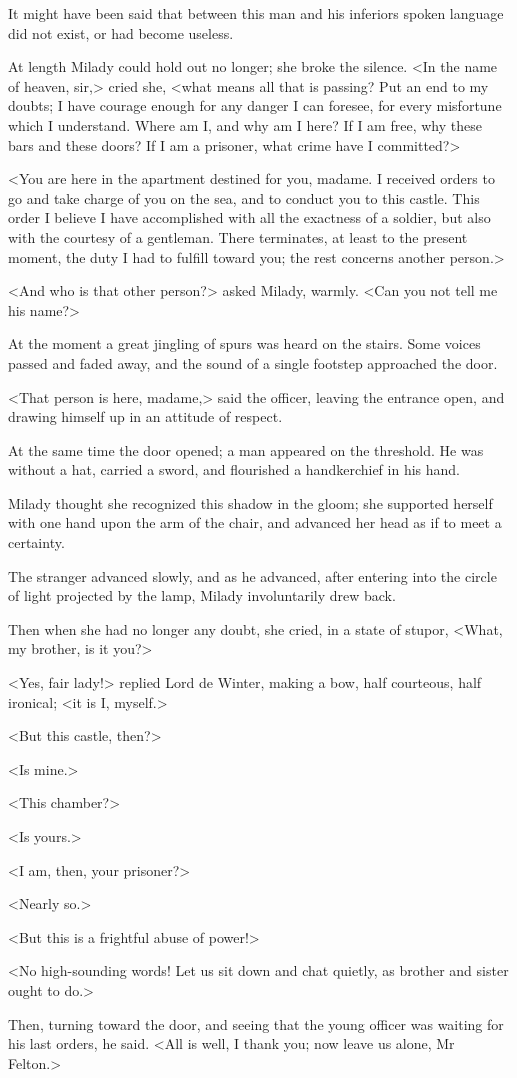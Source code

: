 It might have been said that between this man and his inferiors spoken language did not exist, or had become useless. 

At length Milady could hold out no longer; she broke the silence. <In the name of heaven, sir,> cried she, <what means all that is passing? Put an end to my doubts; I have courage enough for any danger I can foresee, for every misfortune which I understand. Where am I, and why am I here? If I am free, why these bars and these doors? If I am a prisoner, what crime have I committed?> 

<You are here in the apartment destined for you, madame. I received orders to go and take charge of you on the sea, and to conduct you to this castle. This order I believe I have accomplished with all the exactness of a soldier, but also with the courtesy of a gentleman. There terminates, at least to the present moment, the duty I had to fulfill toward you; the rest concerns another person.> 

<And who is that other person?> asked Milady, warmly. <Can you not tell me his name?> 

At the moment a great jingling of spurs was heard on the stairs. Some voices passed and faded away, and the sound of a single footstep approached the door. 

<That person is here, madame,> said the officer, leaving the entrance open, and drawing himself up in an attitude of respect. 

At the same time the door opened; a man appeared on the threshold. He was without a hat, carried a sword, and flourished a handkerchief in his hand. 

Milady thought she recognized this shadow in the gloom; she supported herself with one hand upon the arm of the chair, and advanced her head as if to meet a certainty. 

The stranger advanced slowly, and as he advanced, after entering into the circle of light projected by the lamp, Milady involuntarily drew back. 

Then when she had no longer any doubt, she cried, in a state of stupor, <What, my brother, is it you?> 

<Yes, fair lady!> replied Lord de Winter, making a bow, half courteous, half ironical; <it is I, myself.> 

<But this castle, then?> 

<Is mine.> 

<This chamber?> 

<Is yours.> 

<I am, then, your prisoner?> 

<Nearly so.> 

<But this is a frightful abuse of power!> 

<No high-sounding words! Let us sit down and chat quietly, as brother and sister ought to do.> 

Then, turning toward the door, and seeing that the young officer was waiting for his last orders, he said. <All is well, I thank you; now leave us alone, Mr Felton.> 